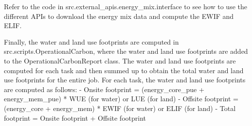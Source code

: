 Refer to the code in src.external_apis.energy_mix.interface to see how to use the different APIs to download the energy mix data and compute the EWIF and ELIF.

Finally, the water and land use footprints are computed in src.scripts.OperationalCarbon, where the water and land use footprints are added to the OperationalCarbonReport class. The water and land use footprints are computed for each task and then summed up to obtain the total water and land use footprints for the entire job. 
For each task, the water and land use footprints are computed as follows:
    - Onsite footprint = (energy_core_pue + energy_mem_pue) * WUE (for water) or LUE (for land)
    - Offsite footprint = (energy_core + energy_mem) * EWIF (for water) or ELIF (for land)
    - Total footprint = Onsite footprint + Offsite footprint